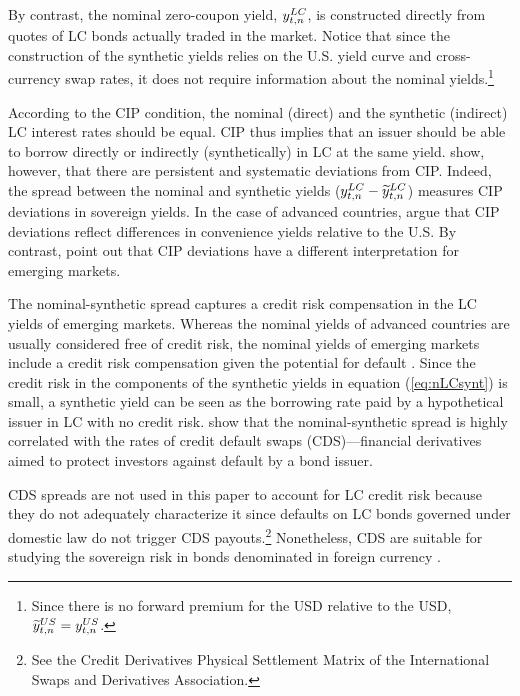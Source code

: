 {By contrast, the nominal zero-coupon yield, \(y_{t,n} ^{LC}\), is constructed directly from quotes of 
LC bonds actually traded in the market.
Notice that since the construction of the synthetic yields %
relies on the U.S. yield curve and cross-currency swap rates, it does not require information about the nominal yields.\footnote{ Since there is no forward premium for the USD relative to the USD, \(\widetilde{y}_{t,n} ^{US} = y_{t,n} ^{US}\).}

According to the CIP condition, the nominal (direct) and the synthetic (indirect) LC interest rates should be equal. 
CIP thus implies that an 
issuer should be able to borrow directly or indirectly (synthetically) in LC at the same yield. 
\cite{DuTepperVerdelhan:2018} show, however, that there are persistent and systematic deviations from CIP. 
Indeed, the spread between the nominal and synthetic yields (\(y_{t,n} ^{LC} - \widetilde{y}_{t,n} ^{LC}\)) measures CIP deviations in sovereign yields.
In the case of advanced countries, \cite{DuImSchreger:2018JIE} argue that CIP deviations reflect differences in convenience yields relative to the U.S.
By contrast, \cite{DuSchreger:2016JoF} point out that CIP deviations have a different interpretation for emerging markets. 

The nominal-synthetic spread captures a credit risk compensation in the LC yields of emerging markets.
Whereas the nominal yields of advanced countries are usually considered free of credit risk, the nominal yields of emerging markets include a credit risk compensation given the potential for default  \citep{ReinhartRogoff:2011}.
Since the credit risk in the components of the synthetic yields in equation (\ref{eq:nLCsynt}) is small, a synthetic yield can be seen as the borrowing rate paid by a hypothetical issuer in LC with no credit risk. 
\cite{DuSchreger:2016JoF} show that the nominal-synthetic spread is highly correlated with the rates of credit default swaps (CDS)---financial derivatives aimed to protect investors against default by a bond issuer.

CDS spreads are not used in this paper to account for LC credit risk because they do not adequately characterize it since defaults on LC bonds governed under domestic law do not trigger CDS payouts.\footnote{ See the Credit Derivatives Physical Settlement Matrix of the International Swaps and Derivatives Association.}
Nonetheless, CDS are suitable for studying the sovereign risk in bonds denominated in foreign currency \citep{Longstaffetal:2011}.

}
